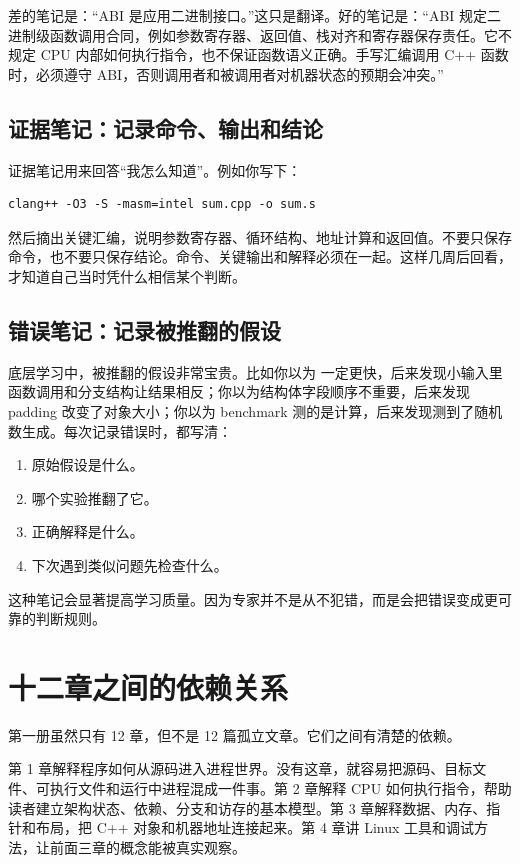 差的笔记是：“ABI 是应用二进制接口。”这只是翻译。好的笔记是：“ABI 规定二进制级函数调用合同，例如参数寄存器、返回值、栈对齐和寄存器保存责任。它不规定 CPU 内部如何执行指令，也不保证函数语义正确。手写汇编调用 C++ 函数时，必须遵守 ABI，否则调用者和被调用者对机器状态的预期会冲突。”

\subsection{证据笔记：记录命令、输出和结论}

证据笔记用来回答“我怎么知道”。例如你写下：

\begin{lstlisting}
clang++ -O3 -S -masm=intel sum.cpp -o sum.s
\end{lstlisting}

然后摘出关键汇编，说明参数寄存器、循环结构、地址计算和返回值。不要只保存命令，也不要只保存结论。命令、关键输出和解释必须在一起。这样几周后回看，才知道自己当时凭什么相信某个判断。

\subsection{错误笔记：记录被推翻的假设}

底层学习中，被推翻的假设非常宝贵。比如你以为  一定更快，后来发现小输入里函数调用和分支结构让结果相反；你以为结构体字段顺序不重要，后来发现 padding 改变了对象大小；你以为 benchmark 测的是计算，后来发现测到了随机数生成。每次记录错误时，都写清：

\begin{enumerate}
  \item 原始假设是什么。
  \item 哪个实验推翻了它。
  \item 正确解释是什么。
  \item 下次遇到类似问题先检查什么。
\end{enumerate}

这种笔记会显著提高学习质量。因为专家并不是从不犯错，而是会把错误变成更可靠的判断规则。

\section{十二章之间的依赖关系}

第一册虽然只有 12 章，但不是 12 篇孤立文章。它们之间有清楚的依赖。

第 1 章解释程序如何从源码进入进程世界。没有这章，就容易把源码、目标文件、可执行文件和运行中进程混成一件事。第 2 章解释 CPU 如何执行指令，帮助读者建立架构状态、依赖、分支和访存的基本模型。第 3 章解释数据、内存、指针和布局，把 C++ 对象和机器地址连接起来。第 4 章讲 Linux 工具和调试方法，让前面三章的概念能被真实观察。

